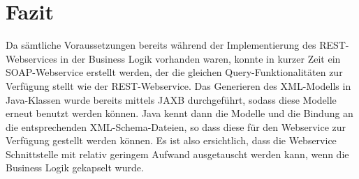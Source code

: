  \section{Fazit}
 
Da sämtliche Voraussetzungen bereits während der Implementierung des REST-Webservices in der Business Logik vorhanden waren, konnte in kurzer Zeit ein SOAP-Webservice erstellt werden, der die gleichen Query-Funktionalitäten zur Verfügung stellt wie der REST-Webservice. Das Generieren des XML-Modells in Java-Klassen wurde bereits mittels JAXB durchgeführt, sodass diese Modelle erneut benutzt werden können. Java kennt dann die Modelle und die Bindung an die entsprechenden XML-Schema-Dateien, so dass diese für den \gls{Webservice} zur Verfügung gestellt werden können. 
Es ist also ersichtlich, dass die Webservice Schnittstelle mit relativ geringem Aufwand ausgetauscht werden kann, wenn die Business Logik gekapselt wurde. 